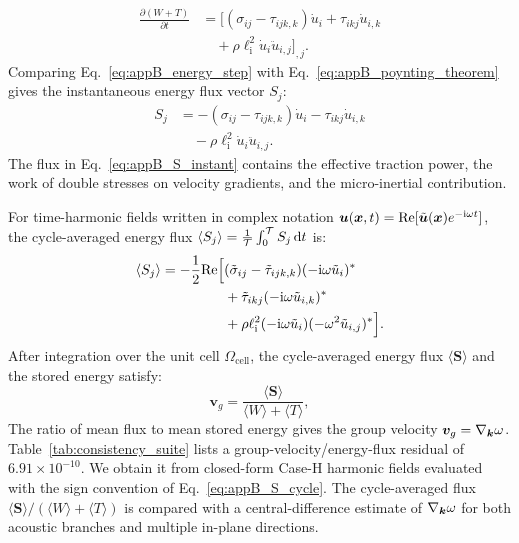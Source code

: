 \begin{equation}
\begin{split}
\frac{\partial (W + T)}{\partial t}
&= \Big[ (\sigma_{ij} - \tau_{ijk,k}) \dot{u}_i + \tau_{ikj} \dot{u}_{i,k} \\
&\quad + \rho \ell_{\mathrm{i}}^2 \dot{u}_i \ddot{u}_{i,j} \Big]_{,j}.
\end{split}
\label{eq:appB_energy_step}
\end{equation}
Comparing Eq.~\eqref{eq:appB_energy_step} with Eq.~\eqref{eq:appB_poynting_theorem} gives the instantaneous energy flux vector $S_j$:
\begin{equation}
\begin{split}
S_j &= -(\sigma_{ij} - \tau_{ijk,k}) \dot{u}_i - \tau_{ikj} \dot{u}_{i,k} \\
&\quad - \rho \ell_{\mathrm{i}}^2 \dot{u}_i \ddot{u}_{i,j}.
\end{split}
\label{eq:appB_S_instant}
\end{equation}
The flux in Eq.~\eqref{eq:appB_S_instant} contains the effective traction power, the work of double stresses on velocity gradients, and the micro-inertial contribution.

For time-harmonic fields written in complex notation $\bm{u}(\bm{x}, t) = \mathrm{Re}[\tilde{\bm{u}}(\bm{x}) e^{-\mathrm{i} \omega t}]$, the cycle-averaged energy flux $\langle S_j \rangle = \frac{1}{\mathcal{T}}\int_0^{\mathcal{T}} S_j\,\mathrm{d} t$ is:
\begin{equation}
\begin{split}
\langle S_j \rangle = -\frac{1}{2} \mathrm{Re} \Big[
&(\tilde{\sigma}_{ij} - \tilde{\tau}_{ijk,k}) (-\mathrm{i} \omega \tilde{u}_i)^* \\
&+ \tilde{\tau}_{ikj} (-\mathrm{i} \omega \tilde{u}_{i,k})^* \\
&+ \rho \ell_{\mathrm{i}}^2 (-\mathrm{i} \omega \tilde{u}_i) (-\omega^2 \tilde{u}_{i,j})^* \Big].
\end{split}
\label{eq:appB_S_cycle}
\end{equation}
After integration over the unit cell $\Omega_{\mathrm{cell}}$, the cycle-averaged energy flux $\langle \bm{S} \rangle$ and the stored energy satisfy:
\begin{equation}
\bm{v}_g = \frac{\langle \bm{S} \rangle}{\langle W \rangle + \langle T \rangle},
\label{eq:appB_vg_identity}
\end{equation}
The ratio of mean flux to mean stored energy gives the group velocity $\bm{v}_g=\nabla_{\bm{k}}\omega$. Table~\ref{tab:consistency_suite} lists a group-velocity/energy-flux residual of $6.91\times10^{-10}$. We obtain it from closed-form Case-H harmonic fields evaluated with the sign convention of Eq.~\eqref{eq:appB_S_cycle}. The cycle-averaged flux $\langle\bm{S}\rangle/(\langle W\rangle+\langle T\rangle)$ is compared with a central-difference estimate of $\nabla_{\bm{k}}\omega$ for both acoustic branches and multiple in-plane directions.
